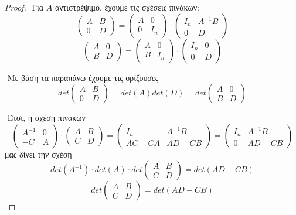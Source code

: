 \documentclass[oneside,a4paper]{article}
\begin{document}
\begin{proof}
	$ $\newline
	Για $A$ αντιστρέψιμο, έχουμε τις σχέσεις πινάκων:
	$$\begin{pmatrix}
		A & B\\
		0 & D
	\end{pmatrix} = \begin{pmatrix}
		A & 0\\
		0 & I_n
	\end{pmatrix} \cdot \begin{pmatrix}
		I_n & A^{-1}B\\
		0 & D
	\end{pmatrix}$$
	$$\begin{pmatrix}
		A & 0\\
		B & D
	\end{pmatrix} = \begin{pmatrix}
		A & 0\\
		B & I_n
	\end{pmatrix} \cdot \begin{pmatrix}
		I_n & 0\\
		0 & D
	\end{pmatrix}$$

	$ $\newline
	Με βάση τα παραπάνω έχουμε τις ορίζουσες
	$$det \begin{pmatrix}
		A & B\\
		0 & D
	\end{pmatrix} = det(A)det(D) = det \begin{pmatrix}
		A & 0\\
		B & D
	\end{pmatrix}$$

	$ $\newline
	Έτσι, η σχέση πινάκων
	$$ \begin{pmatrix}
		A^{-1} & 0\\
		-C & A
	\end{pmatrix} \cdot \begin{pmatrix}
		A & B\\
		C & D
	\end{pmatrix} = \begin{pmatrix}
		I_n & A^{-1}B\\
		AC-CA & AD-CB
	\end{pmatrix} = \begin{pmatrix}
		I_n & A^{-1}B\\
		0 & AD-CB
	\end{pmatrix}$$
	μας δίνει την σχέση
	$$det(A^{-1}) \cdot det(A) \cdot det \begin{pmatrix}
		A & B\\
		C & D
	\end{pmatrix}  = det(AD-CB)$$
	$$det \begin{pmatrix}
		A & B\\
		C & D
	\end{pmatrix}  = det(AD-CB)$$
	\vspace*{1cm}


\end{proof}
\end{document}
